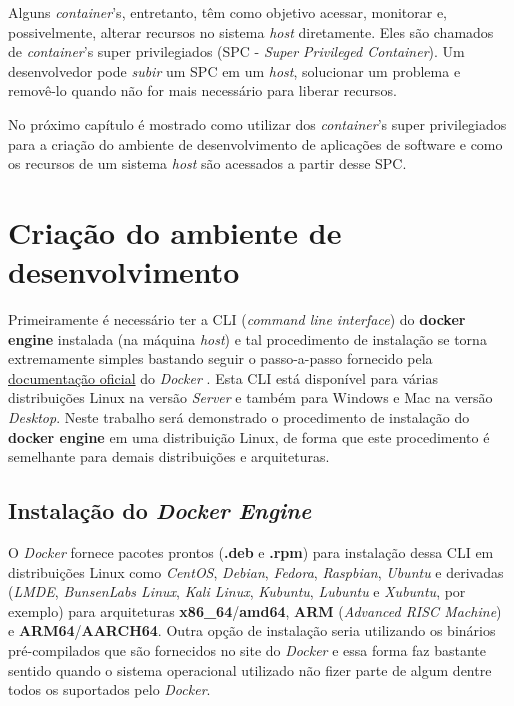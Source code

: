 \documentclass[
  12pt,				%
  openright,			%
  twoside,			%
  a4paper,			%
  english,			%
  french,				%
  spanish,			%
  brazil,				%
  ]{abntex2}
\begin{document}
Alguns \textit{container}'s, entretanto, têm como objetivo acessar, monitorar e, possivelmente, alterar recursos no sistema \textit{host}
diretamente. Eles são chamados de \textit{container}'s super privilegiados (SPC - \textit{Super Privileged Container}). Um desenvolvedor
pode \textit{subir} um SPC em um \textit{host}, solucionar um problema e removê-lo quando não for mais necessário para liberar recursos.

No próximo capítulo é mostrado como utilizar dos \textit{container}'s super privilegiados para a criação do ambiente de
desenvolvimento de aplicações de software e como os recursos de um sistema \textit{host} são acessados a partir desse SPC.

\section*{Criação do ambiente de desenvolvimento}

Primeiramente é necessário ter a CLI (\textit{command line interface}) do \textbf{docker engine} instalada (na máquina \textit{host}) e tal procedimento de
instalação se torna extremamente simples bastando seguir o passo-a-passo fornecido pela \href{https://docs.docker.com/engine/install/}{documentação oficial}
do \textit{Docker} \cite{Docker:2020}.
Esta CLI está disponível para várias distribuições Linux na versão \textit{Server} e também para Windows e Mac na versão \textit{Desktop}. Neste trabalho será
demonstrado o procedimento de instalação do \textbf{docker engine} em uma distribuição Linux, de forma que este procedimento é semelhante para demais distribuições
e arquiteturas.

\subsection*{Instalação do \textit{Docker Engine}}

O \textit{Docker} fornece pacotes prontos (\textbf{.deb} e \textbf{.rpm}) para instalação dessa CLI em distribuições Linux como \textit{CentOS}, \textit{Debian},
\textit{Fedora}, \textit{Raspbian}, \textit{Ubuntu} e derivadas (\textit{LMDE}, \textit{BunsenLabs Linux}, \textit{Kali Linux}, \textit{Kubuntu}, \textit{Lubuntu}
e \textit{Xubuntu}, por exemplo) para arquiteturas \textbf{x86\_64}/\textbf{amd64}, \textbf{ARM} (\textit{Advanced RISC Machine}) e \textbf{ARM64}/\textbf{AARCH64}.
Outra opção de instalação seria utilizando os binários pré-compilados que são fornecidos no site do \textit{Docker} e essa forma
faz bastante sentido quando o sistema operacional utilizado não fizer parte de algum dentre todos os suportados
pelo \textit{Docker}.
\end{document}
